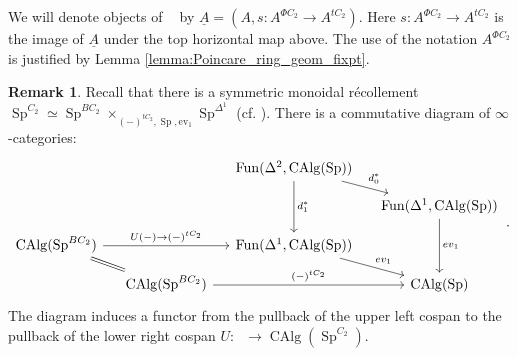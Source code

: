 \documentclass{article}
\DeclareMathOperator{\CAlg}{CAlg} %
\DeclareMathOperator{\CAlgp}{CAlg^p} %
\DeclareMathOperator{\Spectra}{Sp} %
\theoremstyle{definition}
\newtheorem{remark}[equation]{Remark}
\begin{document}
We will denote objects of $\CAlgp$ by $\underline{A}=(A,s:A^{\Phi C_2}\to A^{tC_2})$. 
Here $ s:A^{\Phi C_2}\to A^{tC_2}$ is the image of $\underline{A}$ under the top horizontal map above. 
The use of the notation $A^{\Phi C_2}$ is justified by Lemma \ref{lemma:Poincare_ring_geom_fixpt}. 
\begin{remark}\label{rmk:Poincare_ring_has_underlying_C2_spectrum_alg}
    Recall that there is a symmetric monoidal récollement $ \Spectra^{C_2} \simeq \Spectra^{BC_2} \times_{(-)^{tC_2},\Spectra, \mathrm{ev}_1} \Spectra^{\Delta^1} $ (cf. \cite[Theorem 6.24]{MNN}). 
    There is a commutative diagram of $ \infty $-categories: 
    \[
    \begin{tikzcd}[column sep=small,row sep=small]
     & & \operatorname{Fun}(\Delta^2, \CAlg(\Spectra)) \arrow[rd, "d_0^*"] \arrow[dd, "d_1^*"] & \\
     & & & \operatorname{Fun}(\Delta^1,\CAlg(\Spectra)) \arrow[dd,"ev_{1}"]\\
    \CAlg(\Spectra^{BC_2}) \arrow[rr, "U(-)\to (-)^{tC_2}"] \arrow[rd, equals] & & \operatorname{Fun}(\Delta^1, \CAlg(\Spectra)) \arrow[rd, "ev_{1}"] & \\
      & \CAlg(\Spectra^{BC_2}) \arrow[rr, "(-)^{tC_2}"] & & \CAlg(\Spectra)
    \end{tikzcd}\,.
    \] 
    The diagram induces a functor from the pullback of the upper left cospan to the pullback of the lower right cospan $ U \colon \CAlgp\to \CAlg(\Spectra^{C_2}) $. 


\end{remark}
\end{document}
